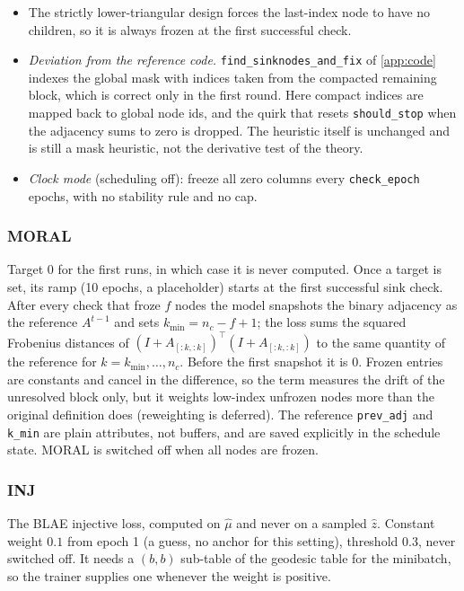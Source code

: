 \begin{itemize}[leftmargin=1.5em]
\item The strictly lower-triangular design forces the last-index node to have no
      children, so it is always frozen at the first successful check.
\item \emph{Deviation from the reference code.} \texttt{find\_sinknodes\_and\_fix} of
      \cref{app:code} indexes the global mask with indices taken from the compacted
      remaining block, which is correct only in the first round. Here compact indices
      are mapped back to global node ids, and the quirk that resets
      \texttt{should\_stop} when the adjacency sums to zero is dropped. The heuristic
      itself is unchanged and is still a mask heuristic, not the derivative test of
      the theory.
\item \emph{Clock mode} (scheduling off): freeze all zero columns every
      \texttt{check\_epoch} epochs, with no stability rule and no cap.
\end{itemize}

\subsubsection{MORAL}
Target $0$ for the first runs, in which case it is never computed. Once a target is
set, its ramp (10 epochs, a placeholder) starts at the first successful sink check.
After every check that froze $f$ nodes the model snapshots the binary adjacency as the
reference $A^{t-1}$ and sets $k_{\min}=n_c-f+1$; the loss sums the squared Frobenius
distances of $(I+A_{[:k,:k]})^\top(I+A_{[:k,:k]})$ to the same quantity of the
reference for $k=k_{\min},\dots,n_c$. Before the first snapshot it is $0$. Frozen
entries are constants and cancel in the difference, so the term measures the drift of
the unresolved block only, but it weights low-index unfrozen nodes more than the
original definition does (reweighting is deferred). The reference \texttt{prev\_adj}
and \texttt{k\_min} are plain attributes, not buffers, and are saved explicitly in the
schedule state. MORAL is switched off when all nodes are frozen.

\subsubsection{INJ}
The BLAE injective loss, computed on $\hat\mu$ and never on a sampled $\hat z$.
Constant weight $0.1$ from epoch 1 (a guess, no anchor for this setting), threshold
$0.3$, never switched off. It needs a $(b,b)$ sub-table of the geodesic table for the
minibatch, so the trainer supplies one whenever the weight is positive.

